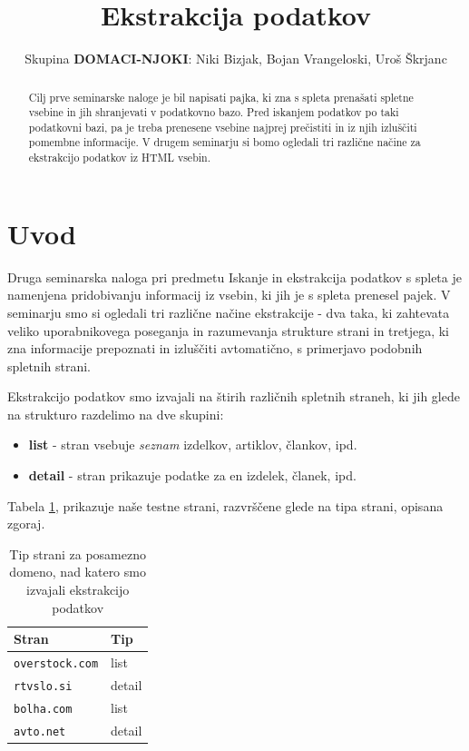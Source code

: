\documentclass[conference]{IEEEtran}
\begin{document}
	
	\title{Ekstrakcija podatkov}
	
	\author{Skupina \textbf{DOMACI-NJOKI}: Niki Bizjak, Bojan Vrangeloski, Uroš Škrjanc}
	
	\maketitle
	
	\begin{abstract}
		Cilj prve seminarske naloge je bil napisati pajka, ki zna s spleta prenašati spletne vsebine in jih shranjevati v podatkovno bazo. Pred iskanjem podatkov po taki podatkovni bazi, pa je treba prenesene vsebine najprej prečistiti in iz njih izluščiti pomembne informacije. V drugem seminarju si bomo ogledali tri različne načine za ekstrakcijo podatkov iz HTML vsebin.
	\end{abstract}
	
	\IEEEpeerreviewmaketitle
	
	\section{Uvod}
	
	Druga seminarska naloga pri predmetu Iskanje in ekstrakcija podatkov s spleta je namenjena pridobivanju informacij iz vsebin, ki jih je s spleta prenesel pajek. V seminarju smo si ogledali tri različne načine ekstrakcije - dva taka, ki zahtevata veliko uporabnikovega poseganja in razumevanja strukture strani in tretjega, ki zna informacije prepoznati in izluščiti avtomatično, s primerjavo podobnih spletnih strani.
	
	Ekstrakcijo podatkov smo izvajali na štirih različnih spletnih straneh, ki jih glede na strukturo razdelimo na dve skupini:
	
	\begin{itemize}
		\itemsep 0em
		\item \textbf{list} - stran vsebuje \textit{seznam} izdelkov, artiklov, člankov, ipd.
		\item \textbf{detail} - stran prikazuje podatke za en izdelek, članek, ipd.
	\end{itemize}

	Tabela \ref{tab:tipi}, prikazuje naše testne strani, razvrščene glede na tipa strani, opisana zgoraj.
	
	\begin{table}[h]
		\centering
		\begin{tabular}{l|l}
			Stran & Tip \\ 
			\hline 
			\texttt{overstock.com} & list \\ 
			\texttt{rtvslo.si} & detail \\ 
			\texttt{bolha.com} & list \\ 
			\texttt{avto.net} & detail \\ 
		\end{tabular}
		\caption{Tip strani za posamezno domeno, nad katero smo izvajali ekstrakcijo podatkov}
		\label{tab:tipi}
	\end{table}
	
\end{document}
